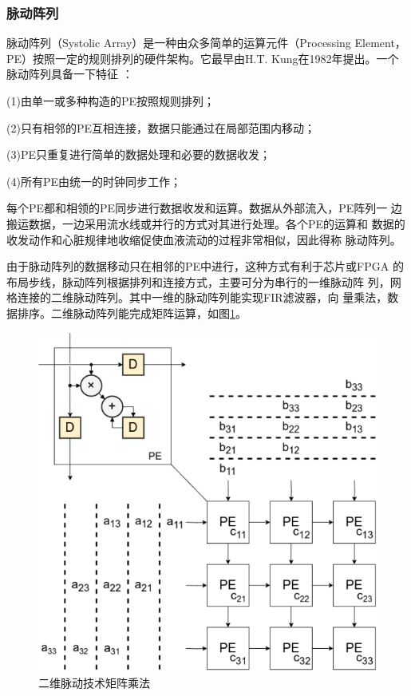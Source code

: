 \documentclass{article}
\numberwithin {equation}{section}
\begin{document}
\begin{spacing}{1.25}
      \subsubsection{脉动阵列}
        \vspace{1em}
        脉动阵列（Systolic Array）是一种由众多简单的运算元件（Processing 
        Element，PE）按照一定的规则排列的硬件架构。它最早由H.T.
        Kung在1982年提出\cite{kung1982systolic}。一个脉动阵列具备一下特征
        \cite{2004vlsi数字信号处理系统}：

        (1)由单一或多种构造的PE按照规则排列；

        (2)只有相邻的PE互相连接，数据只能通过在局部范围内移动；

        (3)PE只重复进行简单的数据处理和必要的数据收发；

        (4)所有PE由统一的时钟同步工作；

        每个PE都和相领的PE同步进行数据收发和运算。数据从外部流入，PE阵列一
        边搬运数据，一边采用流水线或并行的方式对其进行处理。各个PE的运算和
        数据的收发动作和心脏规律地收缩促使血液流动的过程非常相似，因此得称
        脉动阵列。

        由于脉动阵列的数据移动只在相邻的PE中进行，这种方式有利于芯片或FPGA
        的布局步线，脉动阵列根据排列和连接方式，主要可分为串行的一维脉动阵
        列，网格连接的二维脉动阵列。其中一维的脉动阵列能实现FIR滤波器，向
        量乘法，数据排序。二维脉动阵列能完成矩阵运算，如图\ref{2D array}。
        \begin{figure}[H]
          \centering
          \includegraphics[scale=1]{./pictures/2Darray.png}
          \caption{二维脉动技术矩阵乘法}
          \label{2D array}
        \end{figure}


\end{spacing}
\end{document}
